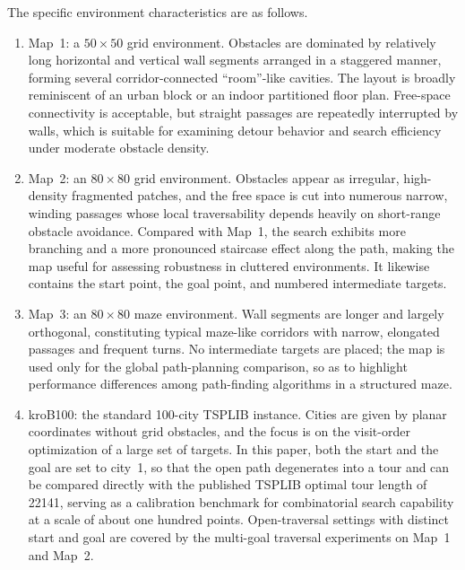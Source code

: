 The specific environment characteristics are as follows.

\begin{enumerate}

\item Map~1: a $50\times 50$ grid environment. Obstacles are dominated by relatively long horizontal and vertical wall segments arranged in a staggered manner, forming several corridor-connected ``room''-like cavities. The layout is broadly reminiscent of an urban block or an indoor partitioned floor plan. Free-space connectivity is acceptable, but straight passages are repeatedly interrupted by walls, which is suitable for examining detour behavior and search efficiency under moderate obstacle density.

\item Map~2: an $80\times 80$ grid environment. Obstacles appear as irregular, high-density fragmented patches, and the free space is cut into numerous narrow, winding passages whose local traversability depends heavily on short-range obstacle avoidance. Compared with Map~1, the search exhibits more branching and a more pronounced staircase effect along the path, making the map useful for assessing robustness in cluttered environments. It likewise contains the start point, the goal point, and numbered intermediate targets.

\item Map~3: an $80\times 80$ maze environment. Wall segments are longer and largely orthogonal, constituting typical maze-like corridors with narrow, elongated passages and frequent turns. No intermediate targets are placed; the map is used only for the global path-planning comparison, so as to highlight performance differences among path-finding algorithms in a structured maze.

\item kroB100: the standard 100-city TSPLIB instance. Cities are given by planar coordinates without grid obstacles, and the focus is on the visit-order optimization of a large set of targets. In this paper, both the start and the goal are set to city~1, so that the open path degenerates into a tour and can be compared directly with the published TSPLIB optimal tour length of 22141, serving as a calibration benchmark for combinatorial search capability at a scale of about one hundred points. Open-traversal settings with distinct start and goal are covered by the multi-goal traversal experiments on Map~1 and Map~2.

\end{enumerate}

